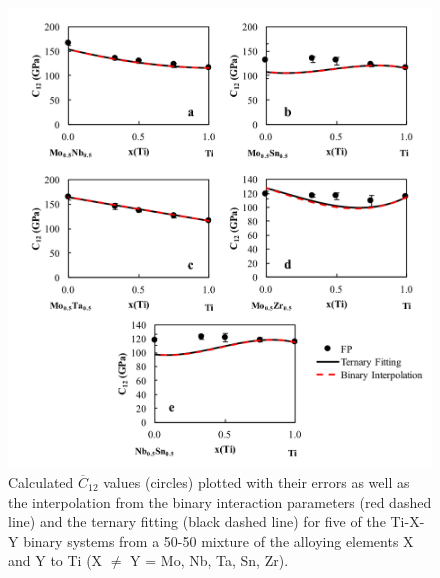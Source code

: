 \pagebreak
\begin{figure}[H]
	\centering
	\includegraphics[width=\textwidth]{Chapter-6/Figures/tixyc121.png}
	\caption{Calculated $\overline{C}_{12}$ values (circles) plotted with their errors as well as the interpolation from the binary interaction parameters (red dashed line) and the ternary fitting (black dashed line) for five of the Ti-X-Y binary systems from a 50-50 mixture of the alloying elements X and Y to Ti (X $\neq$ Y = Mo, Nb, Ta, Sn, Zr).}
	\label{Ch6-figure:tixyc12_1}
\end{figure}

